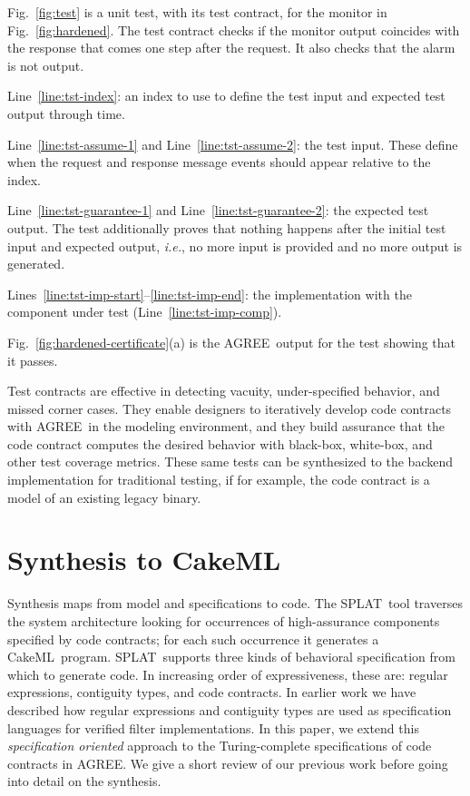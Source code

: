 \documentclass[global,twocolumn]{svjour}
\newcommand{\figref}[1]{Fig.~\ref{#1}}
\newcommand{\lineref}[1]{Line~\ref{#1}}
\newcommand{\linesref}[2]{Lines~\ref{#1}--\ref{#2}}
\newcommand{\agr}{AGREE}
\newcommand{\splt}{SPLAT}
\newcommand{\ckml}{CakeML}
\newcommand{\ie}{\textit{i.e.}}
\begin{document}
\figref{fig:test} is a unit test, with its test contract, for the monitor in \figref{fig:hardened}.
%
The test contract checks if the monitor output coincides with the response that comes one step after the request.
%
It also checks that the alarm is not output.
%
\begin{compactitem}
\item \lineref{line:tst-index}: an index to use to define the test input and expected test output through time.
\item \lineref{line:tst-assume-1} and \lineref{line:tst-assume-2}: the test input. These define when the request and response message events should appear relative to the index.
\item \lineref{line:tst-guarantee-1} and \lineref{line:tst-guarantee-2}: the expected test output.
The test additionally proves that nothing happens after the initial test input and expected output, \ie, no more input is provided and no more output is generated.
\item \linesref{line:tst-imp-start}{line:tst-imp-end}: the implementation with the component under test (\lineref{line:tst-imp-comp}).
\end{compactitem}
%
\figref{fig:hardened-certificate}(a) is the \agr\ output for the test showing that it passes.

Test contracts are effective in detecting vacuity, under-specified behavior, and missed corner cases.
%
They enable designers to iteratively develop code contracts with \agr\ in the modeling environment, and they build assurance that the code contract computes the desired behavior with black-box, white-box, and other test coverage metrics.
%
These same tests can be synthesized to the backend implementation for traditional testing, if for example, the code contract is a model of an existing legacy binary.


\section{Synthesis to \ckml}
\label{sec:synthesis}

Synthesis maps from model and specifications to code.
%
The \splt\ tool traverses the system architecture looking for occurrences of high-assurance components specified by code contracts;
%
for each such occurrence it generates a \ckml\ program.
%
\splt\ supports three kinds of behavioral specification from which to generate code.
%
In increasing order of expressiveness, these are: regular expressions, contiguity types, and code contracts.
%
In earlier work we have described how regular expressions and contiguity types are used as specification languages for verified filter implementations.
%
In this paper, we extend this \emph{specification oriented} approach to the Turing-complete specifications of code contracts in \agr.
%
We give a short review of our previous work before going into detail on the synthesis.
\end{document}
